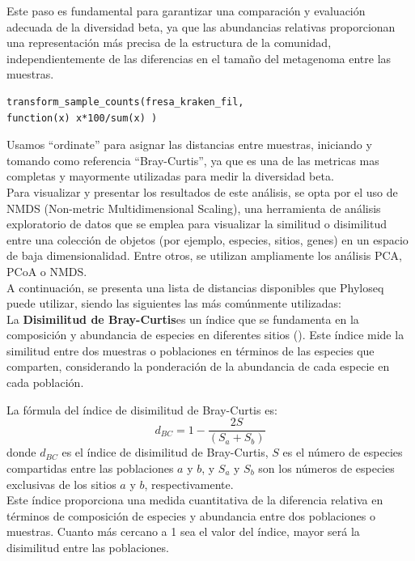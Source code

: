 Este paso es fundamental para garantizar una comparación y evaluación adecuada de la diversidad beta, ya que las abundancias relativas proporcionan una representación más precisa de la estructura de la comunidad, independientemente de las diferencias en el tamaño del metagenoma entre las muestras.\\

\begin{lstlisting}[basicstyle=\small] 
transform_sample_counts(fresa_kraken_fil,
function(x) x*100/sum(x) )
\end{lstlisting}

Usamos “ordinate” para asignar las distancias entre muestras, iniciando y tomando como referencia “Bray-Curtis”, ya que es una de las
metricas mas completas y mayormente utilizadas para medir la diversidad beta.\\

Para visualizar y presentar los resultados de este análisis, se opta por el uso de NMDS (Non-metric Multidimensional Scaling), una herramienta de análisis exploratorio de datos que se emplea para visualizar la similitud o disimilitud entre una colección de objetos (por ejemplo, especies, sitios, genes) en un espacio de baja dimensionalidad. Entre otros, se utilizan ampliamente los análisis PCA, PCoA o NMDS.\\

A continuación, se presenta una lista de distancias disponibles que Phyloseq puede utilizar, siendo las siguientes las más comúnmente utilizadas:\\

La \textbf{Disimilitud de Bray-Curtis}es un índice que se fundamenta en la composición y abundancia de especies en diferentes sitios (\cite{bray&curtis1957}). Este índice mide la similitud entre dos muestras o poblaciones en términos de las especies que comparten, considerando la ponderación de la abundancia de cada especie en cada población.

La fórmula del índice de disimilitud de Bray-Curtis es:
$$d_{BC} = 1 - \frac{2S}{(S_{a} + S_{b})}$$
donde $d_{BC}$ es el índice de disimilitud de Bray-Curtis, $S$ es el número de especies compartidas entre las poblaciones $a$ y $b$, y $S_{a}$ y $S_{b}$ son los números de especies exclusivas de los sitios $a$ y $b$, respectivamente.\\

Este índice proporciona una medida cuantitativa de la diferencia relativa en términos de composición de especies y abundancia entre dos poblaciones o muestras. Cuanto más cercano a 1 sea el valor del índice, mayor será la disimilitud entre las poblaciones.\\

